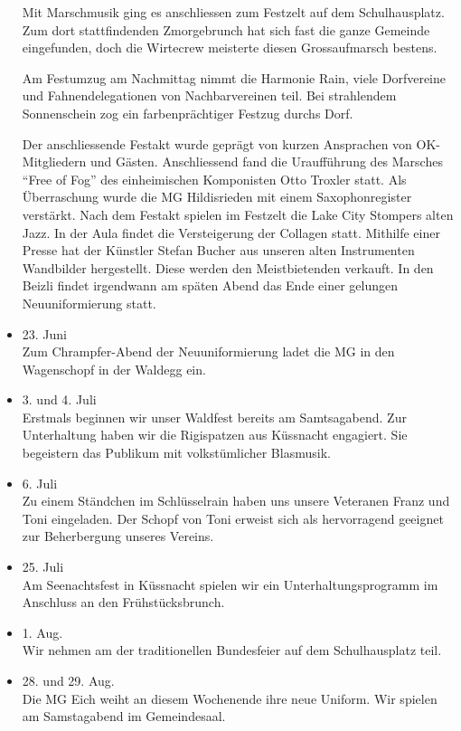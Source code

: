 \begin{history}
\begin{itemize}
        Mit Marschmusik ging es anschliessen zum Festzelt auf dem
        Schulhausplatz. Zum dort stattfindenden Zmorgebrunch hat sich fast die
        ganze Gemeinde eingefunden, doch die Wirtecrew meisterte diesen
        Grossaufmarsch bestens.

        Am Festumzug am Nachmittag nimmt die Harmonie Rain, viele Dorfvereine
        und Fahnendelegationen von Nachbarvereinen teil. Bei strahlendem
        Sonnenschein zog ein farbenprächtiger Festzug durchs Dorf.

        Der anschliessende Festakt wurde geprägt von kurzen Ansprachen
        von OK-Mitgliedern und Gästen. Anschliessend fand die Uraufführung des
        Marsches \enquote{Free of Fog} des einheimischen Komponisten Otto
        Troxler statt. Als Überraschung wurde die MG Hildisrieden mit einem
        Saxophonregister verstärkt. Nach dem Festakt spielen im Festzelt die
        Lake City Stompers alten Jazz. In der Aula findet die Versteigerung der
        Collagen statt. Mithilfe einer Presse hat der Künstler Stefan Bucher aus
        unseren alten Instrumenten Wandbilder hergestellt. Diese werden den
        Meistbietenden verkauft. In den Beizli findet irgendwann am späten Abend
        das Ende einer gelungen Neuuniformierung statt.

        \item[]23. Juni\\
        Zum Chrampfer-Abend der Neuuniformierung ladet die MG in den Wagenschopf
        in der Waldegg ein.

        \item[]3. und 4. Juli\\
        Erstmals beginnen wir unser Waldfest bereits am Samtsagabend. Zur
        Unterhaltung haben wir die Rigispatzen aus Küssnacht engagiert. Sie
        begeistern das Publikum mit volkstümlicher Blasmusik.

        \item[]6. Juli\\
        Zu einem Ständchen im Schlüsselrain haben uns unsere Veteranen Franz und
        Toni eingeladen. Der Schopf von Toni erweist sich als hervorragend
        geeignet zur Beherbergung unseres Vereins.

        \item[]25. Juli\\
        Am Seenachtsfest in Küssnacht spielen wir ein Unterhaltungsprogramm im
        Anschluss an den Frühstücksbrunch.

        \item[]1. Aug.\\
        Wir nehmen am der traditionellen Bundesfeier auf dem Schulhausplatz
        teil.

        \item[]28. und 29. Aug.\\
        Die MG Eich weiht an diesem Wochenende ihre neue Uniform. Wir spielen am
        Samstagabend im Gemeindesaal.



    \end{itemize}

\end{history}
